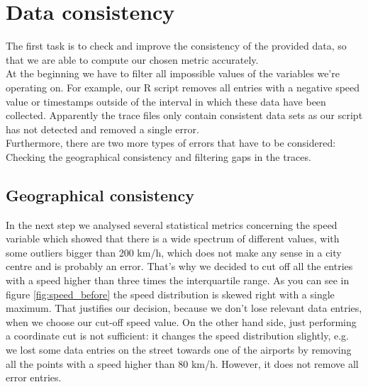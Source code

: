 \documentclass[11pt,conference,a4paper,twocolumns,romanappendices]{IEEEtran}
\begin{document}
\section{Data consistency}
The first task is to check and improve the consistency of the provided data, so that we are able to compute our chosen metric accurately. \\
At the beginning we have to filter all impossible values of the variables we're operating on. For example, our R script removes all entries with a negative speed value or timestamps outside of the interval in which these data have been collected.  Apparently the trace files only contain consistent data sets as our script has not detected and removed a single error. \\
Furthermore, there are two more types of errors that have to be considered: Checking the geographical consistency and filtering gaps in the traces.
\subsection{Geographical consistency}

In the next step we analysed several statistical metrics concerning the speed variable which showed that there is a wide spectrum of different values, with some outliers bigger than 200 km/h, which does not make any sense in a city centre and is probably an error. That's why we decided to cut off all the entries with a speed higher than three times the interquartile range. As you can see in figure \ref{fig:speed_before} the speed distribution is skewed right with a single maximum. That justifies our decision, because we don't lose relevant data entries, when we choose our cut-off speed value. On the other hand side, just performing a coordinate cut is not sufficient: it changes the speed distribution slightly, e.g. we lost some data entries on the street towards one of the airports by removing all the points with a speed higher than 80 km/h. However, it does not remove all error entries. \\
\end{document}

